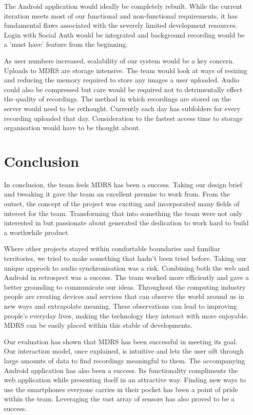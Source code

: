 \documentclass{l3proj}
\begin{document}
The Android application would ideally be completely rebuilt. While the current iteration meets most of our functional and non-functional requirements, it has fundamental flaws associated with the severely limited development resources. Login with Social Auth would be integrated and background recording would be a 'must have' feature from the beginning.

As user numbers increased, scalability of our system would be a key concern. Uploads to MDRS are storage intensive. The team would look at ways of resizing and reducing the memory required to store any images a user uploaded. Audio could also be compressed but  care would be required not to detrimentally effect the quality of recordings. The method in which recordings are stored on the server would need to be rethought. Currently each day has subfolders for every recording uploaded that day. Consideration to the fastest access time to storage organisation would have to be thought about.

\chapter{Conclusion}

In conclusion, the team feels MDRS has been a success. Taking our design brief and tweaking it gave the team an excellent premise to work from. From the outset, the concept of the project was exciting and incorporated many fields of interest for the team. Transforming that into something the team were not only interested in but passionate about generated the dedication to work hard to build a worthwhile product.

Where other projects stayed within comfortable boundaries and familiar territories, we tried to make something that hadn't been tried before. Taking our unique approch to audio synchronisation was a risk. Combining both the web and Android in retrospect was a success. The team worked more efficiently and gave a better grounding to communicate our ideas. Throughout the computing industry people are creating devices and services that can observe the world around us in new ways and extrapolate meaning. These observations can lead to improving people's everyday lives, making the technology they interact with more enjoyable. MDRS can be easily placed within this stable of developments.

Our evaluation has shown that MDRS has been successful in meeting its goal. Our interaction model, once explained, is intuitive and lets the user sift through large amounts of data to find recordings meaningful to them. The accompanying Android application has also been a success. Its functionality compliments the web application while presenting itself in an attractive way. Finding new ways to use the smartphones everyone carries in their pocket has been a point of pride within the team. Leveraging the vast array of sensors has also proved to be a success.
\end{document}
